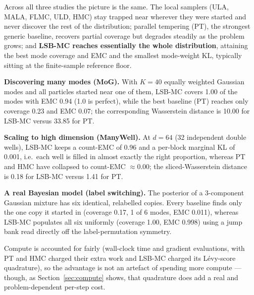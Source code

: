 Across all three studies the picture is the same. The local samplers (ULA, MALA, FLMC, ULD, HMC) stay trapped near wherever they were started and never discover the rest of the distribution; parallel tempering (PT), the strongest generic baseline, recovers partial coverage but degrades steadily as the problem grows; and \textbf{LSB-MC reaches essentially the whole distribution}, attaining the best mode coverage and EMC and the smallest mode-weight KL, typically sitting at the finite-sample reference floor.

\textbf{Discovering many modes (MoG).} With $K{=}40$ equally weighted Gaussian modes and all particles started near one of them, LSB-MC covers 1.00 of the modes with EMC 0.94 (1.0 is perfect), while the best baseline (PT) reaches only coverage 0.23 and EMC 0.07; the corresponding Wasserstein distance is 10.00 for LSB-MC versus 33.85 for PT.

\textbf{Scaling to high dimension (ManyWell).} At $d{=}64$ (32 independent double wells), LSB-MC keeps a count-EMC of 0.96 and a per-block marginal KL of 0.001, i.e.\ each well is filled in almost exactly the right proportion, whereas PT and HMC have collapsed to count-EMC $\approx0.00$; the sliced-Wasserstein distance is 0.18 for LSB-MC versus 1.41 for PT.

\textbf{A real Bayesian model (label switching).} The posterior of a 3-component Gaussian mixture has six identical, relabelled copies. Every baseline finds only the one copy it started in (coverage 0.17, 1 of 6 modes, EMC 0.011), whereas LSB-MC populates all six uniformly (coverage 1.00, EMC 0.998) using a jump bank read directly off the label-permutation symmetry.

Compute is accounted for fairly (wall-clock time and gradient evaluations, with PT and HMC charged their extra work and LSB-MC charged its Lévy-score quadrature), so the advantage is not an artefact of spending more compute --- though, as Section~\ref{sec:compute} shows, that quadrature does add a real and problem-dependent per-step cost.